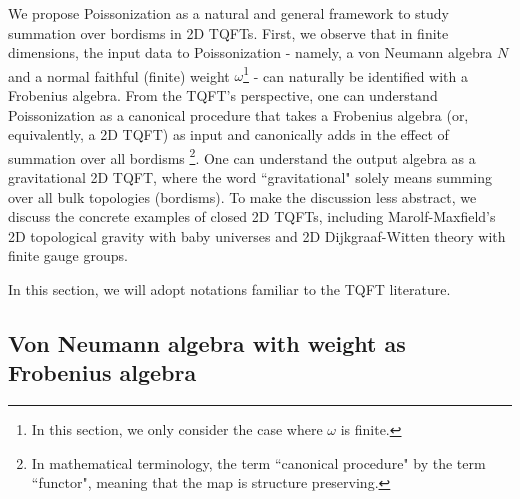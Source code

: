 \documentclass[a4paper,11pt]{article}
\theoremstyle{definition}
\numberwithin{equation}{section}
\begin{document}
We propose Poissonization as a natural and general framework to study summation over bordisms in 2D TQFTs. First, we observe that in finite dimensions, the input data to Poissonization - namely, a von Neumann algebra $N$ and a normal faithful (finite) weight $\omega$\footnote{In this section, we only consider the case where $\omega$ is finite.} - can naturally be identified with a Frobenius algebra. From the TQFT's perspective, one can understand Poissonization as a canonical procedure that takes a Frobenius algebra (or, equivalently, a 2D TQFT) as input and canonically adds in the effect of summation over all bordisms \footnote{In mathematical terminology, the term ``canonical procedure" by the term ``functor", meaning that the map is structure preserving.}. One can understand the output algebra as a gravitational 2D TQFT, where the word ``gravitational" solely means summing over all bulk topologies (bordisms). To make the discussion less abstract, we discuss the concrete examples of closed 2D TQFTs, including Marolf-Maxfield's 2D topological gravity with baby universes and 2D Dijkgraaf-Witten theory with finite gauge groups. 

In this section, we will adopt notations familiar to the TQFT literature.

\subsection{Von Neumann algebra with weight as Frobenius algebra}
\end{document}
